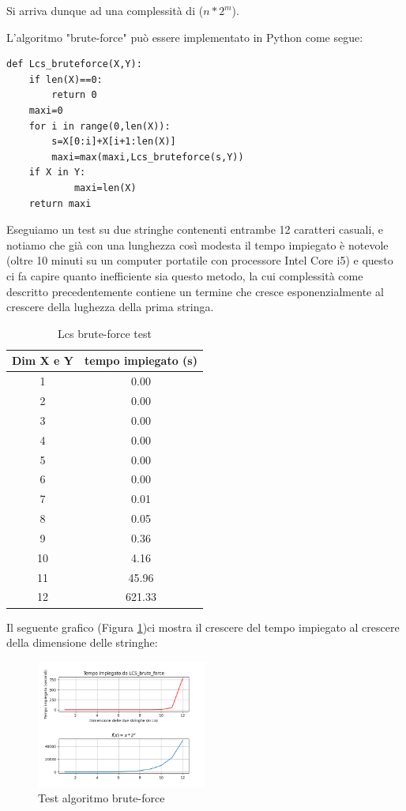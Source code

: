 \documentclass[11pt,a4paper]{article}
\begin{document}
Si arriva dunque ad una complessità di \Theta($n * 2^m$).

L'algoritmo "brute-force" può essere implementato in Python come segue:

\lstset{language=Python} %

\begin{lstlisting}
def Lcs_bruteforce(X,Y):
    if len(X)==0:
        return 0
    maxi=0
    for i in range(0,len(X)):
        s=X[0:i]+X[i+1:len(X)]
        maxi=max(maxi,Lcs_bruteforce(s,Y))
    if X in Y:
            maxi=len(X)
    return maxi     
\end{lstlisting}
Eseguiamo un test su due stringhe contenenti entrambe 12 caratteri casuali, e notiamo che già con una lunghezza così modesta il tempo impiegato è notevole (oltre 10 minuti su un computer portatile con processore Intel Core i5) e questo ci fa capire quanto inefficiente sia questo metodo, la cui complessità come descritto precedentemente contiene un termine che cresce esponenzialmente al crescere della lughezza della prima stringa.

\begin{table}[htbp]
    \centering
    \caption{Lcs brute-force test}
    \begin{tabular}{|c|c|}
        \hline
        Dim X e Y & tempo impiegato (s) \\
        \hline
        1 & 0.00 \\
        2 & 0.00 \\
        3 & 0.00 \\
        4 & 0.00 \\
        5 & 0.00 \\
        6 & 0.00 \\
        7 & 0.01\\
        8 & 0.05 \\
        9 & 0.36 \\
        10 & 4.16 \\
        11 & 45.96\\
        12 & 621.33 \\
        
        \hline
    \end{tabular}
\end{table}

Il seguente grafico (Figura \ref{fig:lcs_bruteforce_test})ci mostra il crescere del tempo impiegato al crescere della dimensione delle stringhe:

\begin{figure}[htbp]
    \centering
    \includegraphics[width=0.5\textwidth]{lcs bruteforce test.png}
    \caption{Test algoritmo brute-force}
    \label{fig:lcs_bruteforce_test}
\end{figure}
\end{document}
